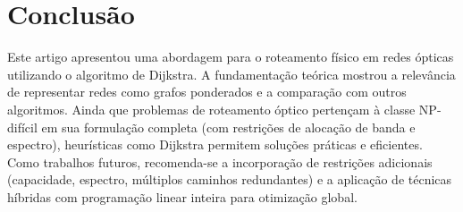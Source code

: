 \section{Conclusão}

Este artigo apresentou uma abordagem para o roteamento físico em redes ópticas
utilizando o algoritmo de Dijkstra. A fundamentação teórica mostrou a
relevância de representar redes como grafos ponderados e a comparação com
outros algoritmos. Ainda que problemas de roteamento óptico pertençam à classe
NP-difícil em sua formulação completa (com restrições de alocação de banda e
espectro), heurísticas como Dijkstra permitem soluções práticas e eficientes.
Como trabalhos futuros, recomenda-se a incorporação de restrições adicionais
(capacidade, espectro, múltiplos caminhos redundantes) e a aplicação de
técnicas híbridas com programação linear inteira para otimização global.
